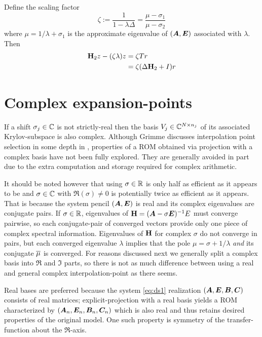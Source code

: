Define the scaling factor 
\[
\zeta := \frac{1}{1-\lambda \Delta} =  \frac{\mu-\sigma_1}{\mu-\sigma_2}
\]
where $\mu=1/\lambda+\sigma_1$ is the approximate eigenvalue of $(\bm{A},\bm{E})$ associated with $\lambda$. 
Then 
\begin{align}
\textbf{\textup{H}}_2 z - (\zeta\lambda) z &=  \zeta T r \nonumber\\
&= \zeta (\Delta\textbf{\textup{H}}_2 + I) r
\label{eq:new_residual}
\end{align}



\section{Complex expansion-points}\label{sec:complex_points}
 If a shift $\sigma_j\in\mathbb{C}$ is not strictly-real  then the basis $V_j\in \mathbb{C}^{N\times n_j}$ of its associated Krylov-subspace  is also complex. 
Although Grimme discusses interpolation point selection in some depth in \cite{grimme1998rational},    properties of a ROM obtained via projection with a complex basis have not been fully explored. They are generally avoided in part due to the extra computation and storage required for complex arithmetic.   

 It should be noted however that using $\sigma\in\mathbb{R}$ is only half as efficient as it appears to be and $\sigma\in\mathbb{C}$ with $\Re(\sigma)\neq 0$ is potentially twice as efficient as it appears.  That is because the system pencil $(\bm{A},\bm{E})$ is real and its complex eigenvalues are conjugate pairs.  If $\sigma \in\mathbb{R}$, eigenvalues of $\textbf{\textup{H}}=(\bm{A}-\sigma \bm{E})^{-1}E$ must converge pairwise, so each conjugate-pair of converged vectors provide only one piece of complex spectral information.   Eigenvalues of $\textbf{\textup{H}}$ for complex $\sigma$ do not converge in pairs, but each converged eigenvalue $\lambda$ implies that the pole $\mu = \sigma+ 1/\lambda$ \emph{and} its conjugate $\overline{\mu}$ is converged.   For reasons discussed next we generally split a complex basis into $\Re$ and $\Im$ parts, so there is not as much difference between using a real and general complex interpolation-point as there seems.


Real bases are preferred because the system \eqref{eq:ds1} realization $(\bm{A},\bm{E},\bm{B},\bm{C})$ consists of real matrices; explicit-projection with a real basis yields a ROM characterized by $(\bm{A}_n, \bm{E}_n, \bm{B}_n, \bm{C}_n)$ which is also real and thus retains desired properties of the original model.  One such property is symmetry of the transfer-function about the $\Re$-axis.


